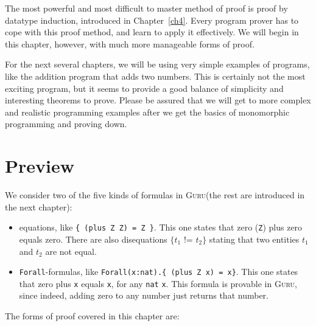 \documentclass{book}[12pt]
\newcommand{\guru}[0]{\textsc{Guru}\xspace}
\begin{document}
The most powerful and most difficult to master method of proof is
proof by datatype induction, introduced in Chapter~\ref{ch4}.  Every
program prover has to cope with this proof method, and learn to apply
it effectively.  We will begin in this chapter, however, with much
more manageable forms of proof.

For the next several chapters, we will be using very simple examples
of programs, like the addition program that adds two numbers.  This is
certainly not the most exciting program, but it seems to provide a
good balance of simplicity and interesting theorems to prove.  Please
be assured that we will get to more complex and realistic programming
examples after we get the basics of monomorphic programming and
proving down.

\section{Preview}

We consider two of the five kinds of formulas in \guru (the rest
are introduced in the next chapter):

\begin{itemize}

\item equations, like \texttt{\{ (plus Z Z) = Z \}}.  This one states
that zero (\texttt{Z}) plus zero equals zero.  There are also
disequations $\{ t_1\texttt{ != } t_2 \}$ stating that two entities
$t_1$ and $t_2$ are not equal.

\item \texttt{Forall}-formulas, like \texttt{Forall(x:nat).\{ (plus Z
x) = x\}}.  This one states that zero plus \texttt{x} equals
\texttt{x}, for any \texttt{nat} \texttt{x}.  This formula is provable
in \guru, since indeed, adding zero to any number just returns that number.

\end{itemize}

The forms of proof covered in this chapter are:
\end{document}
